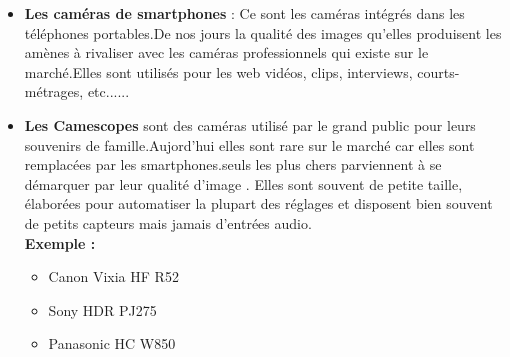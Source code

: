 \begin{itemize}
	\item \textbf{Les caméras de smartphones} : Ce sont les caméras intégrés dans les téléphones portables.De nos jours la qualité des images qu'elles produisent les amènes à rivaliser avec les caméras professionnels qui existe sur le marché.Elles sont utilisés pour les web vidéos, clips, interviews, courts-métrages, etc......\\
	
	\item \textbf{Les Camescopes} sont des caméras utilisé par le grand public pour leurs souvenirs de famille.Aujord'hui elles sont rare sur le marché car elles sont remplacées par les smartphones.seuls les plus chers parviennent à se démarquer par leur qualité d’image . Elles sont souvent de petite taille, élaborées pour automatiser la plupart des réglages et disposent bien souvent de petits capteurs mais jamais d’entrées audio.\\
		\textbf{Exemple :\\}
    	\begin{itemize}
    		\item Canon Vixia HF R52
    		\item Sony HDR PJ275
    		\item Panasonic HC W850
    	\end{itemize}
    	 

\end{itemize}

